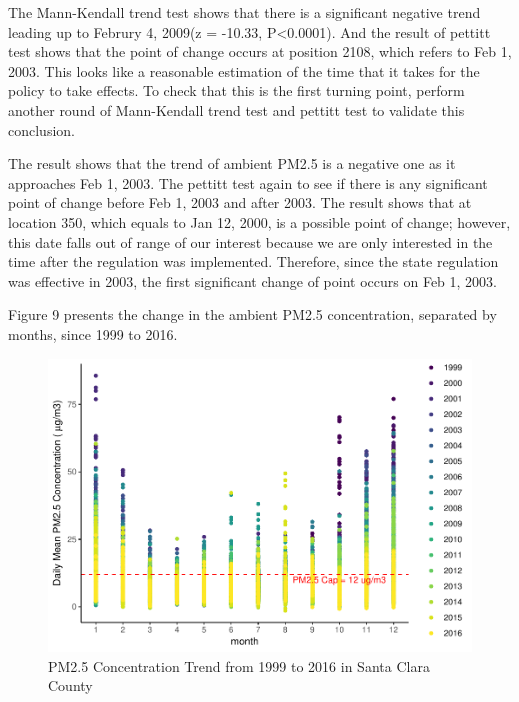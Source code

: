 \documentclass[12pt,]{article}
\newenvironment{Shaded}{\begin{snugshade}}{\end{snugshade}}
\newcommand{\KeywordTok}[1]{\textcolor[rgb]{0.13,0.29,0.53}{\textbf{#1}}}
\newcommand{\DecValTok}[1]{\textcolor[rgb]{0.00,0.00,0.81}{#1}}
\newcommand{\FloatTok}[1]{\textcolor[rgb]{0.00,0.00,0.81}{#1}}
\newcommand{\CommentTok}[1]{\textcolor[rgb]{0.56,0.35,0.01}{\textit{#1}}}
\newcommand{\OperatorTok}[1]{\textcolor[rgb]{0.81,0.36,0.00}{\textbf{#1}}}
\newcommand{\NormalTok}[1]{#1}
\begin{document}
The Mann-Kendall trend test shows that there is a significant negative
trend leading up to Februry 4, 2009(z = -10.33, P\textless{}0.0001). And
the result of pettitt test shows that the point of change occurs at
position 2108, which refers to Feb 1, 2003. This looks like a reasonable
estimation of the time that it takes for the policy to take effects. To
check that this is the first turning point, perform another round of
Mann-Kendall trend test and pettitt test to validate this conclusion.

\begin{Shaded}
\end{Shaded}

The result shows that the trend of ambient PM2.5 is a negative one as it
approaches Feb 1, 2003. The pettitt test again to see if there is any
significant point of change before Feb 1, 2003 and after 2003. The
result shows that at location 350, which equals to Jan 12, 2000, is a
possible point of change; however, this date falls out of range of our
interest because we are only interested in the time after the regulation
was implemented. Therefore, since the state regulation was effective in
2003, the first significant change of point occurs on Feb 1, 2003.

Figure 9 presents the change in the ambient PM2.5 concentration,
separated by months, since 1999 to 2016.

\begin{figure}
\centering
\includegraphics{pm25_files/figure-latex/unnamed-chunk-16-1.pdf}
\caption{PM2.5 Concentration Trend from 1999 to 2016 in Santa Clara
County}
\end{figure}
\end{document}

